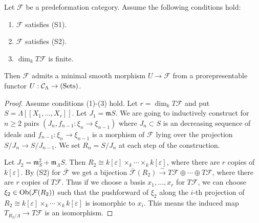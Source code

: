 \begin{lemma}
\label{lemma-miniversal-object-existence-2}
Let $\mathcal F$ be a predeformation category.  Assume the following conditions 
hold:
\begin{enumerate}
\item $\mathcal F$ satisfies \textnormal{(S1)}.
\item $\mathcal F$ satisfies \textnormal{(S2)}.
\item $\dim_{k} T\mathcal F$ is finite.
\end{enumerate}
Then $\mathcal F$ admits a minimal smooth morphism $U \rightarrow \mathcal F$ 
from a prorepresentable functor $U: \mathcal C_{\Lambda} \rightarrow 
\textnormal{(Sets)}$.
\end{lemma}

\begin{proof}
Assume conditions (1)-(3) hold.  Let $r = \dim_{k} T\mathcal F$ and put $S = 
\Lambda[[X_1, \dots, X_r]]$.  Let $J_{1} = \mathfrak{m}{S}$.  We are going to 
inductively construct for $n \geq 2$ pairs $(J_{n}, f_{n-1}: \xi_{n} 
\rightarrow \xi_{n-1})$ where $J_{n} \subset S$ is an decreasing sequence of 
ideals and $f_{n-1}: \xi_{n} \rightarrow \xi_{n-1}$ is a morphism of $\mathcal 
F$ lying over the projection $S/J_{n} \rightarrow S/J_{n-1}$.  We set $R_{n} = 
S/J_{n}$ at each step of the construction.  

\medskip \noindent
Let $J_{2} = \mathfrak{m}_{S}^2 + \mathfrak{m}_{\Lambda}S$.  Then $R_2 \cong 
k[\varepsilon] \times_{k} \cdots \times_{k} k[\varepsilon]$, where there are 
$r$ copies of $k[\varepsilon]$.  By (S2) for $\overline{\mathcal F}$ we get a 
bijection $\overline{\mathcal F}(R_2) \xrightarrow{\sim} T \mathcal F \oplus 
\cdots \oplus T \mathcal F$, where there are $r$ copies of $T\mathcal F$.  Thus 
if we choose a basis $x_1, \dots, x_r$ for $T\mathcal F$, we can choose 
$\xi_{2} \in \textnormal{Ob}(\mathcal F(R_2))$ such that the pushforward of 
$\xi_{2}$ along the $i$-th projection of $R_2 \cong k[\varepsilon] \times_{k} 
\cdots \times_{k} k[\varepsilon]$ is isomorphic to $x_i$.  This means the 
induced map $T_{R_{2}/\Lambda} \rightarrow T\mathcal F$ is an isomorphism.


\end{proof}
